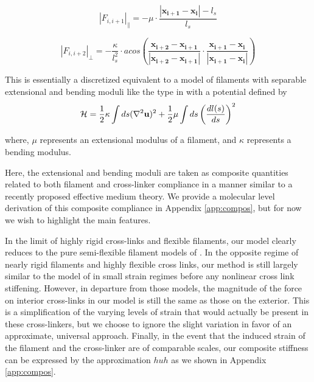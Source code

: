 \documentclass[pre,reprint]{revtex4-1}
\begin{document}
\begin{equation}
|F_{i,i+1}|_{\parallel} = -\mu\cdot\frac{|\mathbf{x_{i+1}}-\mathbf{x_i}|-l_s}{l_s} 
\end{equation}

\begin{equation}
|F_{i,i+2}|_{\perp} = -\frac{\kappa}{l_s^2}\cdot acos\left (\frac{\mathbf{x_{i+2}}-\mathbf{x_{i+1}}}{|\mathbf{x_{i+2}}-\mathbf{x_{i+1}}|} \cdot\frac{\mathbf{x_{i+1}}-\mathbf{x_i}}{|\mathbf{x_{i+1}}-\mathbf{x_i}|} \right ) 
\end{equation}

This is essentially a discretized equivalent to a model of filaments with separable extensional and bending moduli like the type in \cite{theo_hlm} with a potential defined by
\begin{equation}
{\cal H} =\frac{1}{2}\kappa \int ds(\nabla^2\mathbf{u})^2 + \frac{1}{2}\mu \int ds \left ( \frac{dl(s) }{ds} \right )^2
\end{equation}

where, $\mu$ represents an extensional modulus of a filament, and $\kappa$ represents a bending modulus.   

Here, the extensional and bending moduli are taken as composite quantities related to both filament and cross-linker compliance in a manner similar to a recently proposed effective medium theory\cite{theo_crosslinknonlinear}.  We provide a molecular level derivation of this composite compliance in Appendix \ref{app:compos}, but for now we wish to highlight the main features.  

In the limit of highly rigid cross-links and flexible filaments, our model clearly reduces to the pure semi-flexible filament models of \cite{theo_hlm,theo_hlm2}.  In the opposite regime of nearly rigid filaments and highly flexible cross links, our method is still largely similar to the model of \cite{theo_crosslinknonlinear} in small strain regimes before any nonlinear cross link stiffening.  However, in departure from those models, the magnitude of the force on interior cross-links in our model is still the same as those on the exterior.  This is a simplification of the varying levels of strain that would actually be present in these cross-linkers, but we choose to ignore the slight variation in favor of an approximate, universal approach.  Finally, in the event that the induced strain of the filament and the cross-linker are of comparable scales, our composite stiffness can be expressed by the approximation $huh$ as we shown in Appendix \ref{app:compos}.
\end{document}
